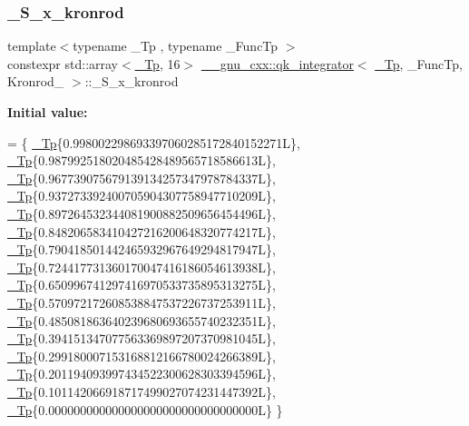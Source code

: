 \subsubsection{\texorpdfstring{\+\_\+\+S\+\_\+x\+\_\+kronrod}{\_S\_x\_kronrod}}
{\footnotesize\ttfamily template$<$typename \+\_\+\+Tp , typename \+\_\+\+Func\+Tp $>$ \\
constexpr std\+::array$<$\hyperlink{namespace____gnu__cxx_a3b19a9c800ca194374ef9172290f7d79}{\+\_\+\+Tp}, 16$>$ \hyperlink{class____gnu__cxx_1_1qk__integrator}{\+\_\+\+\_\+gnu\+\_\+cxx\+::qk\+\_\+integrator}$<$ \hyperlink{namespace____gnu__cxx_a3b19a9c800ca194374ef9172290f7d79}{\+\_\+\+Tp}, \+\_\+\+Func\+Tp, Kronrod\+\_ $>$\+::\+\_\+\+S\+\_\+x\+\_\+kronrod\hspace{0.3cm}{\ttfamily [static]}}

{\bfseries Initial value\+:}
\begin{DoxyCode}
=
      \{
        \hyperlink{namespace____gnu__cxx_a3b19a9c800ca194374ef9172290f7d79}{\_Tp}\{0.998002298693397060285172840152271L\},
        \hyperlink{namespace____gnu__cxx_a3b19a9c800ca194374ef9172290f7d79}{\_Tp}\{0.987992518020485428489565718586613L\},
        \hyperlink{namespace____gnu__cxx_a3b19a9c800ca194374ef9172290f7d79}{\_Tp}\{0.967739075679139134257347978784337L\},
        \hyperlink{namespace____gnu__cxx_a3b19a9c800ca194374ef9172290f7d79}{\_Tp}\{0.937273392400705904307758947710209L\},
        \hyperlink{namespace____gnu__cxx_a3b19a9c800ca194374ef9172290f7d79}{\_Tp}\{0.897264532344081900882509656454496L\},
        \hyperlink{namespace____gnu__cxx_a3b19a9c800ca194374ef9172290f7d79}{\_Tp}\{0.848206583410427216200648320774217L\},
        \hyperlink{namespace____gnu__cxx_a3b19a9c800ca194374ef9172290f7d79}{\_Tp}\{0.790418501442465932967649294817947L\},
        \hyperlink{namespace____gnu__cxx_a3b19a9c800ca194374ef9172290f7d79}{\_Tp}\{0.724417731360170047416186054613938L\},
        \hyperlink{namespace____gnu__cxx_a3b19a9c800ca194374ef9172290f7d79}{\_Tp}\{0.650996741297416970533735895313275L\},
        \hyperlink{namespace____gnu__cxx_a3b19a9c800ca194374ef9172290f7d79}{\_Tp}\{0.570972172608538847537226737253911L\},
        \hyperlink{namespace____gnu__cxx_a3b19a9c800ca194374ef9172290f7d79}{\_Tp}\{0.485081863640239680693655740232351L\},
        \hyperlink{namespace____gnu__cxx_a3b19a9c800ca194374ef9172290f7d79}{\_Tp}\{0.394151347077563369897207370981045L\},
        \hyperlink{namespace____gnu__cxx_a3b19a9c800ca194374ef9172290f7d79}{\_Tp}\{0.299180007153168812166780024266389L\},
        \hyperlink{namespace____gnu__cxx_a3b19a9c800ca194374ef9172290f7d79}{\_Tp}\{0.201194093997434522300628303394596L\},
        \hyperlink{namespace____gnu__cxx_a3b19a9c800ca194374ef9172290f7d79}{\_Tp}\{0.101142066918717499027074231447392L\},
        \hyperlink{namespace____gnu__cxx_a3b19a9c800ca194374ef9172290f7d79}{\_Tp}\{0.000000000000000000000000000000000L\}
      \}
\end{DoxyCode}


